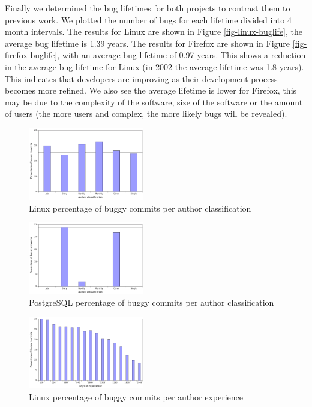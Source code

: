 Finally we determined the bug lifetimes for both projects to contrast
them to previous work. We plotted the number of bugs for each lifetime
divided into 4 month intervals. The results for Linux are shown in
Figure \ref{fig-linux-buglife}, the average bug lifetime is 1.39
years. The results for Firefox are shown in Figure
\ref{fig-firefox-buglife}, with an average bug lifetime of 0.97
years. This shows a reduction in the average bug lifetime for Linux (in
2002 the average lifetime was 1.8 years). This indicates that
developers are improving as their development process becomes more
refined. We also see the average lifetime is lower for Firefox, this
may be due to the complexity of the software, size of the software or
the amount of users (the more users and complex, the more likely bugs will be
revealed).

\begin{figure}
\begin{center}
\includegraphics[width=0.45\textwidth]{linux-bugginess-author-class.pdf}
\end{center}
\caption{Linux percentage of buggy commits per author classification}
\label{fig-linux-bugginess-author-class}
\end{figure}

\begin{figure}
\begin{center}
\includegraphics[width=0.45\textwidth]{postgresql-bugginess-author-class.pdf}
\end{center}
\caption{PostgreSQL percentage of buggy commits per author classification}
\label{fig-postgresql-bugginess-author-class}
\end{figure}

\begin{figure}
\begin{center}
\includegraphics[width=0.45\textwidth]{linux-bugginess-experience.pdf}
\end{center}
\caption{Linux percentage of buggy commits per author experience}
\label{fig-linux-bugginess-experience}
\end{figure}

